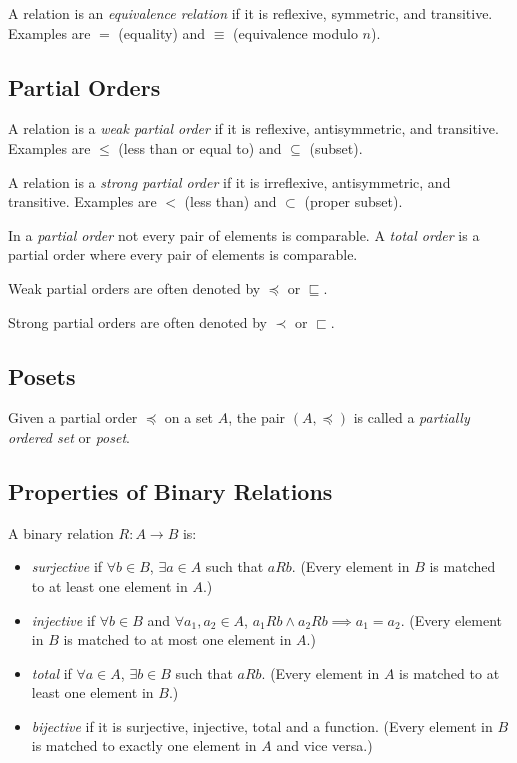 \documentclass[../main.tex]{subfiles}
\begin{document}
A relation is an \textit{equivalence relation} if it is reflexive, symmetric, and transitive. Examples are $=$ (equality) and $\equiv$ (equivalence modulo $n$).

\subsection{Partial Orders}

A relation is a \textit{weak partial order} if it is reflexive, antisymmetric, and transitive. Examples are $\leq$ (less than or equal to) and $\subseteq$ (subset).

A relation is a \textit{strong partial order} if it is irreflexive, antisymmetric, and transitive. Examples are $<$ (less than) and $\subset$ (proper subset).

In a \textit{partial order} not every pair of elements is comparable. A \textit{total order} is a partial order where every pair of elements is comparable.

Weak partial orders are often denoted by $\preceq$ or $\sqsubseteq$.

Strong partial orders are often denoted by $\prec$ or $\sqsubset$.

\subsection{Posets}

Given a partial order $\preceq$ on a set $A$, the pair $(A, \preceq)$ is called a \textit{partially ordered set} or \textit{poset}.

\subsection{Properties of Binary Relations}

A binary relation $R : A \to B$ is:

\begin{itemize}
  \item \textit{surjective} if $\forall b \in B$, $\exists a \in A$ such that $aRb$. (Every element in $B$ is matched to at least one element in $A$.)
  \item \textit{injective} if $\forall b \in B$ and $\forall a_1, a_2 \in A$, $a_1Rb \land a_2Rb \implies a_1 = a_2$. (Every element in $B$ is matched to at most one element in $A$.)
  \item \textit{total} if $\forall a \in A$, $\exists b \in B$ such that $aRb$. (Every element in $A$ is matched to at least one element in $B$.)
  \item \textit{bijective} if it is surjective, injective, total and a function. (Every element in $B$ is matched to exactly one element in $A$ and vice versa.)
\end{itemize}
\end{document}
